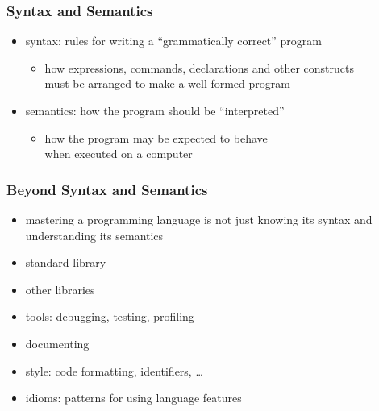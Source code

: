 \documentclass[dvipsnames]{beamer}
\theoremstyle{plain}
\begin{document}
\begin{frame}
  \frametitle{Syntax and Semantics}

  \begin{itemize}
    \item \alert{syntax}: rules for writing a ``grammatically correct'' program
    \begin{itemize}
      \item how expressions, commands, declarations and other constructs\\
        must be arranged to make a well-formed program
    \end{itemize}

    \bigskip
    \item \alert{semantics}: how the program should be ``interpreted''
    \begin{itemize}
      \item how the program may be expected to behave\\
        when executed on a computer
    \end{itemize}
  \end{itemize}
\end{frame}

\begin{frame}
  \frametitle{Beyond Syntax and Semantics}

  \begin{itemize}
    \item mastering a programming language is not just knowing its syntax
      and understanding its semantics

    \bigskip
    \item standard library
    \item other libraries
    \item tools: debugging, testing, profiling
    \item documenting
    \item style: code formatting, identifiers, \ldots

    \pause
    \medskip
    \item idioms: patterns for using language features
  \end{itemize}
\end{frame}
\end{document}
